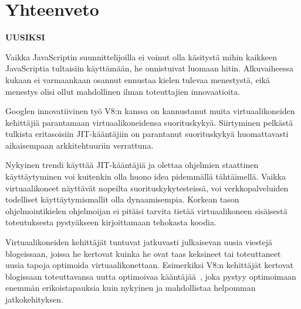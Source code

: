 \section{Yhteenveto}

\textbf{UUSIKSI}

Vaikka JavaScriptin suunnittelijoilla ei voinut olla käsitystä mihin kaikkeen JavaScriptia tultaisiin käyttämään, he onnistuivat luomaan hitin. Alkuvaiheessa kukaan ei varmaankaan osannut ennustaa kielen tulevaa menestystä, eikä menestys olisi ollut mahdollinen ilman toteuttajien innovaatioita.

Googlen innovatiivinen työ V8:n kanssa on kannustanut muita virtuaalikoneiden kehittäjiä parantamaan virtuaalikoneidensa suorituskykyä. Siirtyminen pelkästä tulkista eritasoisiin JIT-kääntäjiin on parantanut suorituskykyä huomattavasti aikaisempaan arkkitehtuuriin verrattuna.

Nykyinen trendi käyttää JIT-kääntäjiä ja olettaa ohjelmien staattinen käyttäytyminen voi kuitenkin olla huono idea pidemmällä tähtäimellä. Vaikka virtuaalikoneet näyttävät nopeilta suorituskykytesteissä, voi verkkopalveluiden todelliset käyttäytymismallit olla dynaamisempia. Korkean tason ohjelmointikielen ohjelmoijan ei pitäisi tarvita tietää virtuaalikoneen sisäisestä toteutuksesta pystyäkseen kirjoittamaan tehokasta koodia.

Virtuaalikoneiden kehittäjät tuntuvat jatkuvasti julkaisevan uusia viestejä blogeissaan, joissa he kertovat kuinka he ovat taas keksineet tai toteuttaneet uusia tapoja optimoida virtuaalikonettaan. Esimerkiksi V8:n kehittäjät kertovat blogissaan toteuttavansa uutta optimoivaa kääntäjää~\cite{turbofan}, joka pystyy optimoimaan enemmän erikoistapauksia kuin nykyinen ja mahdollistaa helpomman jatkokehityksen.

